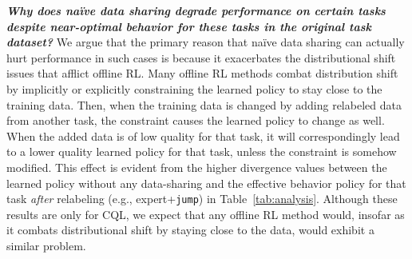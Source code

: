 \textbf{\emph{Why does na\"ive data sharing degrade performance on certain tasks despite near-optimal behavior for these tasks in the original task dataset?}} We argue that the primary reason that na\"{i}ve data sharing can actually hurt performance in such cases is because it exacerbates the distributional shift issues that afflict offline RL. Many offline RL methods combat distribution shift by implicitly or explicitly constraining the learned policy to stay close to the training data. Then, when the training data is changed by adding relabeled data from another task, the constraint causes the learned policy to change as well. When the added data is of low quality for that task, it will correspondingly lead to a lower quality learned policy for that task, unless the constraint is somehow modified.
This effect is evident from the higher divergence values between the learned policy without any data-sharing and the effective behavior policy for that task \emph{after} relabeling (e.g., expert+\texttt{jump}) in Table~\ref{tab:analysis}. Although these results are only for CQL, we expect that any offline RL method would, insofar as it combats distributional shift by staying close to the data, would exhibit a similar problem. 



